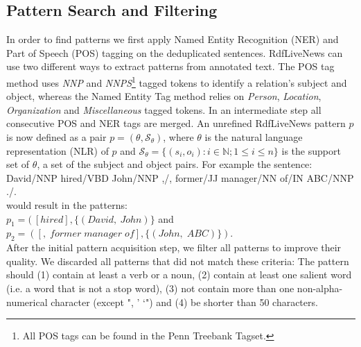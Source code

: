 \documentclass[a4paper]{llncs}
\newcommand{\NAME}{RdfLiveNews}
\begin{document}
\subsection{Pattern Search and Filtering}
\label{subsec:pattern_search}
In order to find patterns we first apply Named Entity Recognition (NER) and Part of Speech (POS) tagging on the deduplicated sentences.
\NAME{} can use two different ways to extract patterns from annotated text.
The POS tag method uses \emph{NNP} and \emph{NNPS}\footnote{All POS tags can be found in the Penn Treebank Tagset.} tagged tokens to identify a relation's subject and object, whereas the Named Entity Tag method relies on \emph{Person}, \emph{Location}, \emph{Organization} and \emph{Miscellaneous} tagged tokens.
In an intermediate step all consecutive POS and NER tags are merged.
An unrefined \NAME{} pattern $p$ is now defined as a pair $p = (\theta, \mathcal{S_\theta})$, where $\theta$  is the natural language representation (NLR) of $p$ and $\mathcal{S_\theta} = \{(s_i,o_i) : i \in \mathbb{N}; 1 \le i \le n\}$ is the support set of $\theta$, a set of the subject and object pairs. 
For example the sentence:
\vspace*{4pt}\\
{\noindent\small David/NNP hired/VBD John/NNP ,/, former/JJ manager/NN of/IN ABC/NNP ./.}
\vspace*{4pt}\\
would result in the patterns:
\vspace*{6pt}\\
\indent$p_1 = (\:[hired], \{(David,\:John)\}$ and \newline
\indent$p_2 = ([,\;former\;manager\;of], \{(John,\;ABC)\})$.
\vspace*{4pt}\\
After the initial pattern acquisition step, we filter all patterns to improve their quality.
We discarded all patterns that did not match these criteria:
The pattern should (1) contain at least a verb or a noun, (2) contain at least one salient word (i.e. a word that is not a stop word), (3) not contain more than one non-alpha-numerical character (except ", ' `") and (4) be shorter than 50 characters.
\end{document}

